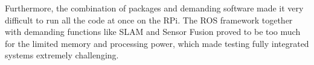 Furthermore, the combination of packages and demanding software made it very difficult to run all the code at once on the RPi. The ROS framework together with demanding functions like SLAM and Sensor Fusion proved to be too much for the limited memory and processing power, which made testing fully integrated systems extremely challenging.
